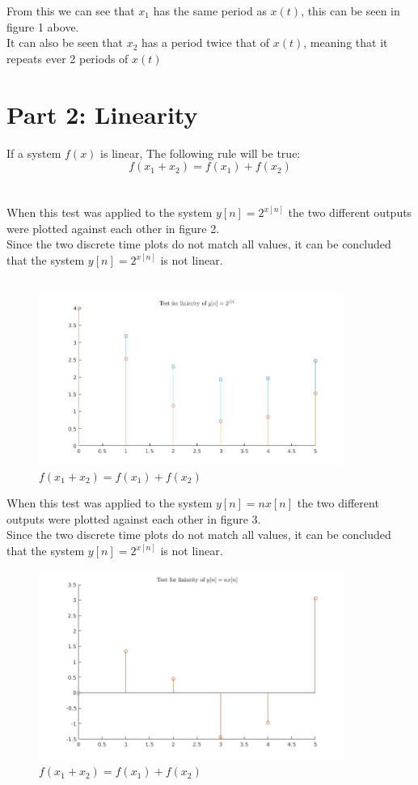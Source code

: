 \documentclass[a4paper,11pt]{article}
\begin{document}
From this we can see that $x_1$ has the same period as $x(t)$, this can be seen in figure 1 above.\\ 
It can also be seen that $x_2$ has a period twice that of $x(t)$, meaning that it repeats ever 2 periods of $x(t)$
\newpage

\section*{Part 2: Linearity}
If a system $f(x)$ is linear, The following rule will be true:\\
$$f(x_1+x_2) = f(x_1)+f(x_2)$$\\ \\
When this test was applied to the system $y[n]=2^{x[n]}$ the two different outputs were plotted against each other in figure 2.\\
Since the two discrete time plots do not match all values, it can be concluded that the system $y[n]=2^{x[n]}$ is not linear.\\ \\
\begin{figure}[h]
\centering
\includegraphics[width=10cm]{linarity_test_1.jpg}
\caption{$f(x_1+x_2) = f(x_1)+f(x_2)$}
\end{figure}

When this test was applied to the system $y[n]=nx[n]$ the two different outputs were plotted against each other in figure 3.\\
Since the two discrete time plots do not match all values, it can be concluded that the system $y[n]=2^{x[n]}$ is not linear.
\begin{figure}[h]
\centering
\includegraphics[width=10cm]{linarity_test_2.jpg}
\caption{$f(x_1+x_2) = f(x_1)+f(x_2)$}
\end{figure}
\newpage
\end{document}
